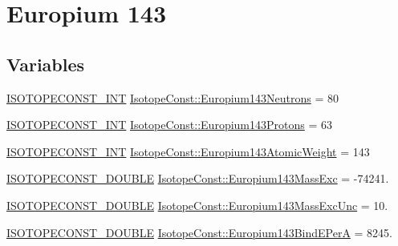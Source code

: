 \hypertarget{group___isotope_const-_europium-_eu143}{}\section{Europium 143}
\label{group___isotope_const-_europium-_eu143}
\subsection*{Variables}
\begin{DoxyCompactItemize}
\item 
\mbox{\hyperlink{group___isotope_const-_macros_ga5f18360b3e99483a35c32d789e62621c}{I\+S\+O\+T\+O\+P\+E\+C\+O\+N\+S\+T\+\_\+\+I\+NT}} \mbox{\hyperlink{group___isotope_const-_europium-_eu143_gab3466c3eb1cbc30e9ebc244e958c9c0e}{Isotope\+Const\+::\+Europium143\+Neutrons}} = 80
\item 
\mbox{\hyperlink{group___isotope_const-_macros_ga5f18360b3e99483a35c32d789e62621c}{I\+S\+O\+T\+O\+P\+E\+C\+O\+N\+S\+T\+\_\+\+I\+NT}} \mbox{\hyperlink{group___isotope_const-_europium-_eu143_ga29d63c4232770ab1f23b0a351e2871a3}{Isotope\+Const\+::\+Europium143\+Protons}} = 63
\item 
\mbox{\hyperlink{group___isotope_const-_macros_ga5f18360b3e99483a35c32d789e62621c}{I\+S\+O\+T\+O\+P\+E\+C\+O\+N\+S\+T\+\_\+\+I\+NT}} \mbox{\hyperlink{group___isotope_const-_europium-_eu143_ga9f39b284bc58676d0132b04039691598}{Isotope\+Const\+::\+Europium143\+Atomic\+Weight}} = 143
\item 
\mbox{\hyperlink{group___isotope_const-_macros_ga8f45a7272ce02c0b4c65c44636ed719a}{I\+S\+O\+T\+O\+P\+E\+C\+O\+N\+S\+T\+\_\+\+D\+O\+U\+B\+LE}} \mbox{\hyperlink{group___isotope_const-_europium-_eu143_gab78e6a1bbc6284b59a0712eb2d875416}{Isotope\+Const\+::\+Europium143\+Mass\+Exc}} = -\/74241.
\item 
\mbox{\hyperlink{group___isotope_const-_macros_ga8f45a7272ce02c0b4c65c44636ed719a}{I\+S\+O\+T\+O\+P\+E\+C\+O\+N\+S\+T\+\_\+\+D\+O\+U\+B\+LE}} \mbox{\hyperlink{group___isotope_const-_europium-_eu143_ga28f7207591b2c3556496b28b0eff4d76}{Isotope\+Const\+::\+Europium143\+Mass\+Exc\+Unc}} = 10.
\item 
\mbox{\hyperlink{group___isotope_const-_macros_ga8f45a7272ce02c0b4c65c44636ed719a}{I\+S\+O\+T\+O\+P\+E\+C\+O\+N\+S\+T\+\_\+\+D\+O\+U\+B\+LE}} \mbox{\hyperlink{group___isotope_const-_europium-_eu143_ga92afec1dcffec5d55e23768f39b42a36}{Isotope\+Const\+::\+Europium143\+Bind\+E\+PerA}} = 8245.
\item 

\end{DoxyCompactItemize}
